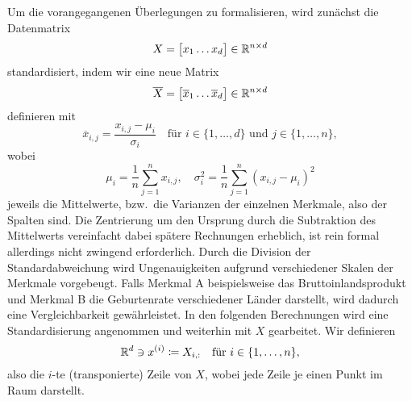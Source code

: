 Um die vorangegangenen Überlegungen zu formalisieren, wird zunächst die Datenmatrix
\begin{equation*}
    X = 
    \big[
        \begin{matrix}
            x_1 \dots x_d
        \end{matrix}    
    \big] \in \mathbb{R}^{n \times d}
\end{equation*} 
standardisiert, indem wir eine neue Matrix 
\begin{equation*}
    \overline{X} = 
        \begin{bmatrix}
            \overline{x}_1 \dots \overline{x}_d
        \end{bmatrix} \in \mathbb{R}^{n \times d}
\end{equation*} 
definieren mit 
\begin{equation*}
    \overline{x}_{i,j} = \frac{x_{i,j}-\mu_i}{\sigma_i} \quad \text{für } i \in \{1,\ldots,d\} \text{ und } j \in \{1,\ldots,n\},
\end{equation*}  
wobei 
\begin{equation*}
    \mu_i = \frac{1}{n}\sum_{j=1}^{n}x_{i,j}, \quad \sigma_{i}^{2} = \frac{1}{n}\sum_{j=1}^{n}{(x_{i,j} - \mu_{i})}^{2}
\end{equation*}
jeweils die Mittelwerte, bzw.\ die Varianzen der einzelnen Merkmale, also der Spalten sind.
Die Zentrierung um den Ursprung durch die Subtraktion des Mittelwerts vereinfacht dabei spätere Rechnungen erheblich, ist rein formal allerdings nicht zwingend erforderlich.
Durch die Division der Standardabweichung wird Ungenauigkeiten aufgrund verschiedener Skalen der Merkmale vorgebeugt.
Falls Merkmal A beispielsweise das Bruttoinlandsprodukt und Merkmal B die Geburtenrate verschiedener Länder darstellt, wird dadurch eine Vergleichbarkeit gewährleistet.
In den folgenden Berechnungen wird eine Standardisierung angenommen und weiterhin mit \(X\) gearbeitet.
Wir definieren 
\begin{equation*}
    \mathbb{R}^{d} \ni x^{(i)} \coloneqq X_{i,:} \quad \text{für } i \in \{1,\ldots,n\},
\end{equation*}
also die \(i\)-te (transponierte) Zeile von \(X\), wobei jede Zeile je einen Punkt im Raum darstellt.

